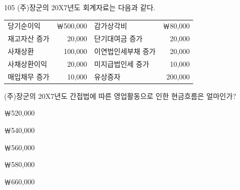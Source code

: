 \begin{question}{105}
(주)장군의 20X7년도 회계자료는 다음과 같다.

{\small\centering
\begin{tabular}{lrlr}
\hline
당기순이익 & ￦500,000 & 감가상각비 & ￦80,000 \\
재고자산 증가 & 20,000 & 단기대여금 증가 & 20,000 \\
사채상환 & 100,000 & 이연법인세부채 증가 & 20,000 \\
사채상환이익 & 20,000 & 미지급법인세 증가 & 10,000 \\
매입채무 증가 & 10,000 & 유상증자 & 200,000 \\
\hline
\end{tabular}
\par}

(주)장군의 20X7년도 간접법에 따른 영업활동으로 인한 현금흐름은 얼마인가? \par
\begin{choices}
  \item ￦520,000
  \item ￦540,000
  \item ￦560,000
  \item ￦580,000
  \item ￦660,000
\end{choices}
\end{question}

